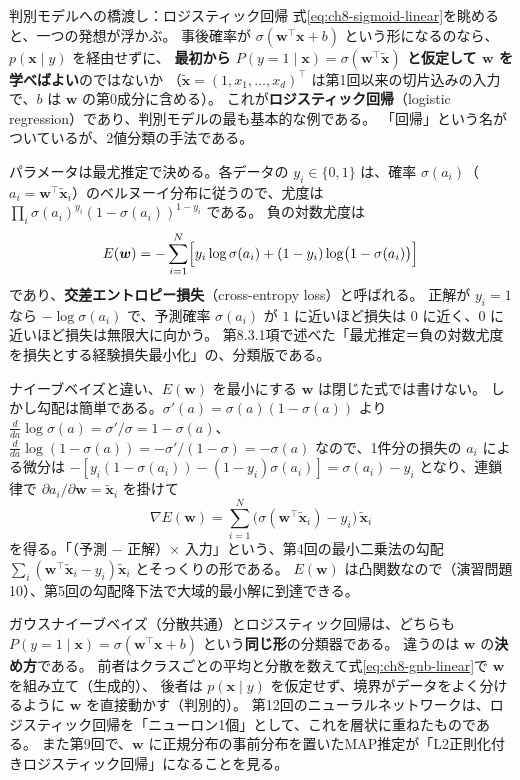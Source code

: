 \begin{mlcolumn}{判別モデルへの橋渡し：ロジスティック回帰}
式\eqref{eq:ch8-sigmoid-linear}を眺めると、一つの発想が浮かぶ。
事後確率が $\sigma(\bm{w}^\top\bm{x} + b)$ という形になるのなら、$p(\bm{x} \mid y)$ を経由せずに、
\textbf{最初から $P(y = 1 \mid \bm{x}) = \sigma(\bm{w}^\top\tilde{\bm{x}})$ と仮定して $\bm{w}$ を学べばよい}のではないか
（$\tilde{\bm{x}} = (1, x_1, \ldots, x_d)^\top$ は第1回以来の切片込みの入力で、$b$ は $\bm{w}$ の第0成分に含める）。
これが\textbf{ロジスティック回帰}（logistic regression）であり、判別モデルの最も基本的な例である。
「回帰」という名がついているが、2値分類の手法である。

パラメータは最尤推定で決める。各データの $y_i \in \{0, 1\}$ は、確率 $\sigma(a_i)$（$a_i = \bm{w}^\top\tilde{\bm{x}}_i$）のベルヌーイ分布に従うので、尤度は
$\prod_i \sigma(a_i)^{y_i}(1 - \sigma(a_i))^{1 - y_i}$ である。
負の対数尤度は
\begin{equation*}
  E(\bm{w}) = -\sum_{i=1}^N \Bigl[ y_i \log \sigma(a_i) + (1 - y_i)\log\bigl(1 - \sigma(a_i)\bigr) \Bigr]
\end{equation*}
であり、\textbf{交差エントロピー損失}（cross-entropy loss）と呼ばれる。
正解が $y_i = 1$ なら $-\log \sigma(a_i)$ で、予測確率 $\sigma(a_i)$ が $1$ に近いほど損失は $0$ に近く、$0$ に近いほど損失は無限大に向かう。
第8.3.1項で述べた「最尤推定＝負の対数尤度を損失とする経験損失最小化」の、分類版である。

ナイーブベイズと違い、$E(\bm{w})$ を最小にする $\bm{w}$ は閉じた式では書けない。
しかし勾配は簡単である。$\sigma'(a) = \sigma(a)(1 - \sigma(a))$ より $\frac{d}{da}\log\sigma(a) = \sigma'/\sigma = 1 - \sigma(a)$、$\frac{d}{da}\log(1 - \sigma(a)) = -\sigma'/(1 - \sigma) = -\sigma(a)$ なので、1件分の損失の $a_i$ による微分は
$-[y_i(1 - \sigma(a_i)) - (1 - y_i)\sigma(a_i)] = \sigma(a_i) - y_i$ となり、連鎖律で $\partial a_i / \partial \bm{w} = \tilde{\bm{x}}_i$ を掛けて
\begin{equation*}
  \nabla E(\bm{w}) = \sum_{i=1}^N \bigl( \sigma(\bm{w}^\top\tilde{\bm{x}}_i) - y_i \bigr)\,\tilde{\bm{x}}_i
\end{equation*}
を得る。「（予測 $-$ 正解）$\times$ 入力」という、第4回の最小二乗法の勾配 $\sum_i (\bm{w}^\top\tilde{\bm{x}}_i - y_i)\tilde{\bm{x}}_i$ とそっくりの形である。
$E(\bm{w})$ は凸関数なので（演習問題10）、第5回の勾配降下法で大域的最小解に到達できる。

ガウスナイーブベイズ（分散共通）とロジスティック回帰は、どちらも $P(y = 1 \mid \bm{x}) = \sigma(\bm{w}^\top\bm{x} + b)$ という\textbf{同じ形}の分類器である。
違うのは $\bm{w}$ の\textbf{決め方}である。
前者はクラスごとの平均と分散を数えて式\eqref{eq:ch8-gnb-linear}で $\bm{w}$ を組み立て（生成的）、
後者は $p(\bm{x} \mid y)$ を仮定せず、境界がデータをよく分けるように $\bm{w}$ を直接動かす（判別的）。
第12回のニューラルネットワークは、ロジスティック回帰を「ニューロン1個」として、これを層状に重ねたものである。
また第9回で、$\bm{w}$ に正規分布の事前分布を置いたMAP推定が「L2正則化付きロジスティック回帰」になることを見る。
\end{mlcolumn}


